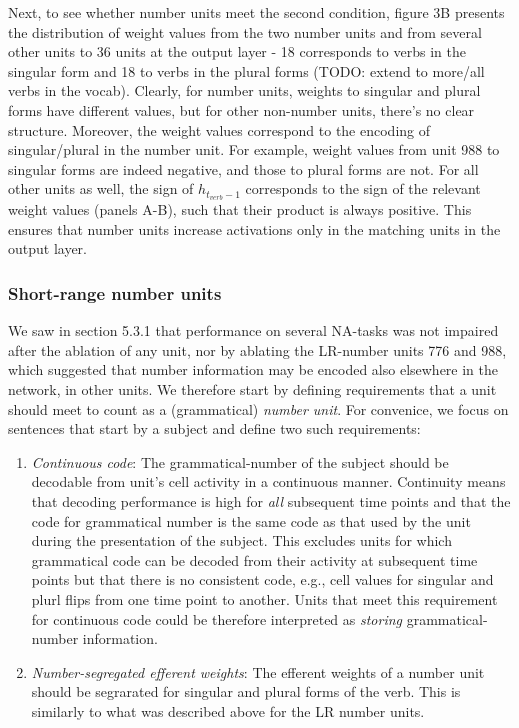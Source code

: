 Next, to see whether number units meet the second condition, figure 3B presents the distribution of weight values from the two number units and from several other units to 36 units at the output layer - 18 corresponds to verbs in the singular form and 18 to verbs in the plural forms (TODO: extend to more/all verbs in the vocab). 
Clearly, for number units, weights to singular and plural forms have different values, but for other non-number units, there's no clear structure. 
Moreover, the weight values correspond to the encoding of singular/plural in the number unit. 
For example, weight values from unit 988 to singular forms are indeed negative, and those to plural forms are not. 
For all other units as well, the sign of $h_{t_{verb}-1}$ corresponds to the sign of the relevant weight values (panels A-B), such that their product is always positive. 
This ensures that number units increase activations only in the matching units in the output layer.

\subsubsection{Short-range number units}
We saw in section 5.3.1 that performance on several NA-tasks was not impaired after the ablation of any unit, nor by ablating the LR-number units 776 and 988, which suggested that number information may be encoded also elsewhere in the network, in other units. 
We therefore start by defining requirements that a unit should meet to count as a (grammatical) \textit{number unit}. 
For convenice, we focus on sentences that start by a subject and define two such requirements: 
\begin{enumerate}
    \item \textit{Continuous code}: The grammatical-number of the subject should be decodable from unit's cell activity in a continuous manner. Continuity means that decoding performance is high for \textit{all} subsequent time points and that the code for grammatical number is the same code as that used by the unit during the presentation of the subject. This excludes units for which grammatical code can be decoded from their activity at subsequent time points but that there is no consistent code, e.g., cell values for singular and plurl flips from one time point to another. Units that meet this requirement for continuous code could be therefore interpreted as \textit{storing} grammatical-number information.

    \item \textit{Number-segregated efferent weights}: The efferent weights of a number unit should be segrarated for singular and plural forms of the verb. This is similarly to what was described above for the LR number units. 

\end{enumerate}

